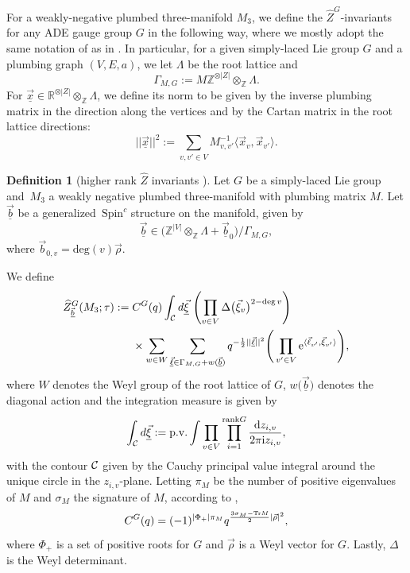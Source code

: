 \documentclass[10pt,a4paper]{amsart}
\def\BR{\mathbb{R}}
\def\BZ{\mathbb{Z}}
\def\ex{{\rm e}}
\theoremstyle{definition}
\newtheorem{defn}[thm]{Definition}
\numberwithin{equation}{section}
\begin{document}
For a weakly-negative plumbed three-manifold $M_3$, we define the $\widehat Z^G$-invariants for any ADE gauge group $G$ in the following way, where we mostly adopt the same notation of as in \cite{chengUpC}. In particular, for a given simply-laced Lie group $G$ and a plumbing graph $(V,E,a)$, we let $\Lambda$ be the root lattice and
\begin{equation*}
 \Gamma_{M,G}:=M\BZ^{\otimes |Z|}\otimes_{\BZ} \Lambda .
\end{equation*}
For $\vec{\underline{x}}\in\BR^{\otimes |Z|}\otimes_{\BZ} \Lambda $, we define its norm to be given by the inverse plumbing matrix in the direction along the vertices and by the Cartan matrix in the root lattice directions:
\begin{equation*}
|| \underline{\vec{x}} ||^2 := \sum_{v,v'\in V} M^{-1}_{v,v'} \langle \vec{x}_v, \vec{x}_{v'} \rangle.
\end{equation*}

\begin{defn}[higher rank $\widehat Z$ invariants \cite{chengUpC, Chung:2018rea,Park:2019xey}]\label{dfn:blocks}
 Let $G$ be a simply-laced Lie group and~$M_3$ a weakly negative plumbed three-manifold with plumbing matrix $M$. Let $\vec{\underline{b}}$ be a generalized~$\text{Spin}^c$ structure on the manifold, given by
 \begin{equation}
\vec{\underline{b}}\in \bigl(\BZ^{|V|} \otimes_\BZ \Lambda +\vec{\underline{b}}_0\bigr) /
\Gamma_{M,G},
\label{eq:bfromcoker}
\end{equation}
where $ \vec{b}_{0,v}=\mathrm{deg}(v)\vec\rho$.

We define
 \begin{align}
\widehat{Z}^G_{\underline{\vec{b}}}(M_3;\tau) :={}&C^G(q) \int_{\cal C} d \underline{\vec{\xi}}\,\left( \prod_{v \in V} \Delta\bigl(\vec{\xi}_v\bigr)^{2 - \deg v} \right)\nonumber\\
&\times
 \sum_{w \in {W}} \sum_{\underline{\vec{\ell}} \in \Gamma_{M,G} +w(\underline{\vec{b}}) } q^{-\frac{1}{2}|| \underline{\vec{\ell}}||^2}
 \Bigg( \prod_{v' \in V} \ex^{\langle \vec{\ell}_{v'}, \vec{\xi}_{v'} \rangle} \Bigg),\label{def:ZhatHR-3mfdvoa}
 \end{align}
 where $W$ denotes the Weyl group of the root lattice of $G$, $w\bigl(\underline{\vec{b}}\bigr) $ denotes the diagonal action  and the integration measure is given by
 \[
 \int_{\cal C} d \underline{\vec{\xi}} :={\rm p.v.} \int\prod_{v\in V} \prod_{i =1}^{\text{rank}G} {\frac{{\rm d}z_{i,v}}{2\pi {\rm i} z_{i,v}}},
\]
 with the contour ${\cal C}$ given by the Cauchy principal value integral around the unique circle in the $z_{i,v}$-plane.
 Letting $\pi_M$ be the number of positive eigenvalues of $M$ and $\sigma_M$ the signature of $M$, according to \cite{Park:2019xey},
 \[%
 C^G(q)= (-1)^{|\Phi_+|\pi_M}q^{{\frac{3\sigma_M-{\rm Tr} M}{2}} |\vec \rho|^2},
 \]
 where $ \Phi_+$ is a set of positive roots for $G$ and $\vec \rho$ is a Weyl vector for $G$. Lastly, $\Delta$ is the Weyl determinant.
\end{defn}
\end{document}
